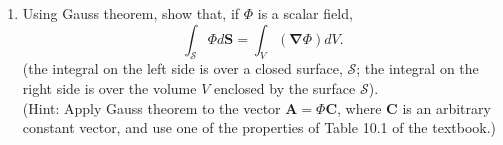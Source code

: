 \documentclass[fleqn]{article}
\begin{document}
\begin{enumerate}
    \item Using Gauss theorem, show that, if $\Phi$ is a scalar field,
    $$        
    \int_{\mathcal S}\Phi d{\mathbf S}=\int_{V} (\mathbf{\nabla} \Phi) dV .
    $$
    (the integral on the left side is over a closed surface, $\mathcal S$; the integral on the right side is over the volume $V$ enclosed by the surface  $\mathcal S$). \\
    (Hint: Apply Gauss theorem to the vector $\mathbf{A} = \Phi\mathbf{C}$, where $\mathbf{C}$ is an arbitrary constant vector, and use one of the properties of Table 10.1 of the textbook.)
  \end{enumerate}
\end{document}
